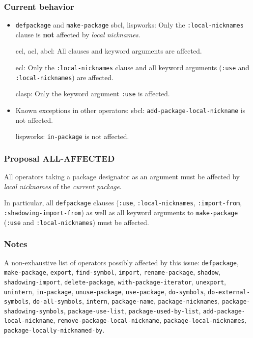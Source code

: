 \documentclass[11pt]{article}
\begin{document}
\subsubsection{Current behavior}
\label{sec:org430a3fc}
\begin{itemize}
\item \texttt{defpackage} and \texttt{make-package}
sbcl, lispworks:
  Only the \texttt{:local-nicknames} clause is \textbf{not} affected by \emph{local nicknames}.

ccl, acl, abcl:
  All clauses and keyword arguments are affected.

ecl:
  Only the \texttt{:local-nicknames} clause and all keyword arguments (\texttt{:use} and
  \texttt{:local-nicknames}) are affected.

clasp:
  Only the keyword argument \texttt{:use} is affected.
\item Known exceptions in other operators:
sbcl: \texttt{add-package-local-nickname} is not affected.

lispworks: \texttt{in-package} is not affected.
\end{itemize}
\subsubsection{Proposal ALL-AFFECTED}
\label{sec:orgea80085}
All operators taking a package designator as an argument must be affected by
\emph{local nicknames} of the \emph{current package}.

In particular, all \texttt{defpackage} clauses (\texttt{:use}, \texttt{:local-nicknames},
\texttt{:import-from}, \texttt{:shadowing-import-from}) as well as all keyword arguments to
\texttt{make-package} (\texttt{:use} and \texttt{:local-nicknames}) must be affected.
\subsubsection{Notes}
\label{sec:org2766d95}
A non-exhaustive list of operators possibly affected by this issue:
  \texttt{defpackage}, \texttt{make-package}, \texttt{export}, \texttt{find-symbol}, \texttt{import},
  \texttt{rename-package}, \texttt{shadow}, \texttt{shadowing-import}, \texttt{delete-package},
  \texttt{with-package-iterator}, \texttt{unexport}, \texttt{unintern}, \texttt{in-package}, \texttt{unuse-package},
  \texttt{use-package}, \texttt{do-symbols}, \texttt{do-external-symbols}, \texttt{do-all-symbols}, \texttt{intern},
  \texttt{package-name}, \texttt{package-nicknames}, \texttt{package-shadowing-symbols},
  \texttt{package-use-list}, \texttt{package-used-by-list}, \texttt{add-package-local-nickname},
  \texttt{remove-package-local-nickname}, \texttt{package-local-nicknames},
  \texttt{package-locally-nicknamed-by}.
\end{document}
